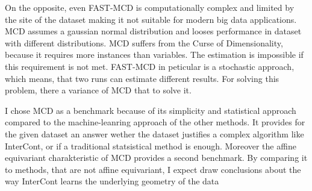 On the opposite, even FAST-MCD is computationally complex and limited by the site of the dataset making it not suitable for modern big data applications.
MCD assumes a gaussian normal distribution and looses performance in dataset with different distributions.
MCD suffers from the Curse of Dimensionality, because it requires more instances than variables. 
The estimation is impossible if this requirement is not met.
FAST-MCD in peticular is a stochastic approach, which means, that two runs can estimate different results.
For solving this problem, there a variance of MCD that to solve it. \citep[p.5]{smiti2020critical}


I chose MCD as a benchmark because of its simplicity and statistical approach compared to the machine-leanring approach of the other methods.
It provides for the given dataset an answer wether the dataset justifies a complex algorithm like InterCont, or if a traditional statsistical method is enough. 
Moreover the affine equivariant charakteristic of MCD provides a second benchmark.
By comparing it to methods, that are not affine equivariant, I expect draw conclusions about the way InterCont learns the underlying geometry of the data 



